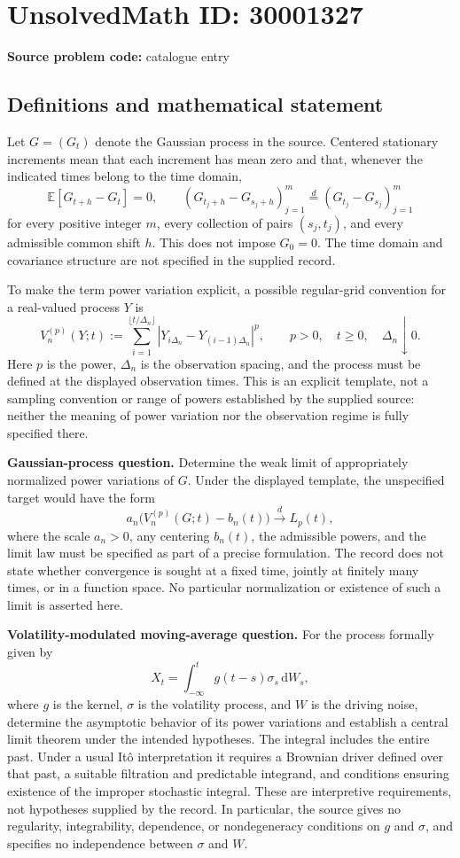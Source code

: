 \documentclass[11pt]{article}
\begin{document}
\section*{UnsolvedMath ID: 30001327}
\textbf{Source problem code:} catalogue entry
\subsection{Definitions and mathematical statement}
Let \(G=(G_t)\) denote the Gaussian process in the source. Centered stationary increments mean that each increment has mean zero and that, whenever the indicated times belong to the time domain,
\[
\mathbb E[G_{t+h}-G_t]=0,
\qquad
(G_{t_j+h}-G_{s_j+h})_{j=1}^{m}
\overset{d}{=}
(G_{t_j}-G_{s_j})_{j=1}^{m}
\]
for every positive integer \(m\), every collection of pairs \((s_j,t_j)\), and every admissible common shift \(h\). This does not impose \(G_0=0\). The time domain and covariance structure are not specified in the supplied record.

To make the term power variation explicit, a possible regular-grid convention for a real-valued process \(Y\) is
\[
V_n^{(p)}(Y;t)
:=\sum_{i=1}^{\lfloor t/\Delta_n\rfloor}
\left|Y_{i\Delta_n}-Y_{(i-1)\Delta_n}\right|^p,
\qquad p>0,\quad t\geq0,\quad \Delta_n\downarrow0.
\]
Here \(p\) is the power, \(\Delta_n\) is the observation spacing, and the process must be defined at the displayed observation times. This is an explicit template, not a sampling convention or range of powers established by the supplied source: neither the meaning of power variation nor the observation regime is fully specified there.

\textbf{Gaussian-process question.} Determine the weak limit of appropriately normalized power variations of \(G\). Under the displayed template, the unspecified target would have the form
\[
a_n\bigl(V_n^{(p)}(G;t)-b_n(t)\bigr)
\xrightarrow{\ d\ }L_p(t),
\]
where the scale \(a_n>0\), any centering \(b_n(t)\), the admissible powers, and the limit law must be specified as part of a precise formulation. The record does not state whether convergence is sought at a fixed time, jointly at finitely many times, or in a function space. No particular normalization or existence of such a limit is asserted here.

\textbf{Volatility-modulated moving-average question.} For the process formally given by
\[
X_t=\int_{-\infty}^{t}g(t-s)\sigma_s\,\mathrm dW_s,
\]
where \(g\) is the kernel, \(\sigma\) is the volatility process, and \(W\) is the driving noise, determine the asymptotic behavior of its power variations and establish a central limit theorem under the intended hypotheses. The integral includes the entire past. Under a usual It\^o interpretation it requires a Brownian driver defined over that past, a suitable filtration and predictable integrand, and conditions ensuring existence of the improper stochastic integral. These are interpretive requirements, not hypotheses supplied by the record. In particular, the source gives no regularity, integrability, dependence, or nondegeneracy conditions on \(g\) and \(\sigma\), and specifies no independence between \(\sigma\) and \(W\).
\end{document}

